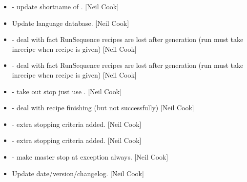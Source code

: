\documentclass[a4paper,10pt,english]{report}
\begin{document}
\begin{itemize}
\item {} 
 - update shortname of
. {[}Neil Cook{]}

\item {} 
Update language database. {[}Neil Cook{]}

\item {} 
 - deal with fact RunSequence
recipes are lost after generation (run must take inrecipe when recipe
is given) {[}Neil Cook{]}

\item {} 
 - deal with fact RunSequence
recipes are lost after generation (run must take inrecipe when recipe
is given) {[}Neil Cook{]}

\item {} 
 - take out stop just use
. {[}Neil Cook{]}

\item {} 
 - deal with recipe finishing (but
not successfully) {[}Neil Cook{]}

\item {} 
 - extra stopping criteria added.
{[}Neil Cook{]}

\item {} 
 - extra stopping criteria added.
{[}Neil Cook{]}

\item {} 
 - make master stop at exception
always. {[}Neil Cook{]}

\item {} 
Update date/version/changelog. {[}Neil Cook{]}

\end{itemize}
\end{document}
